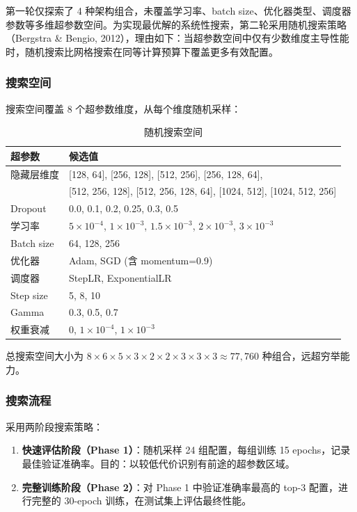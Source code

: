 \documentclass[12pt,a4paper]{ctexart}
\begin{document}
第一轮仅探索了 4 种架构组合，未覆盖学习率、batch size、优化器类型、调度器参数等多维超参数空间。为实现最优解的系统性搜索，第二轮采用随机搜索策略（Bergstra \& Bengio, 2012），理由如下：当超参数空间中仅有少数维度主导性能时，随机搜索比网格搜索在同等计算预算下覆盖更多有效配置。

\subsubsection{搜索空间}

搜索空间覆盖 8 个超参数维度，从每个维度随机采样：

\begin{table}[H]
\centering
\caption{随机搜索空间}
\begin{tabular}{@{}ll@{}}
\toprule
\textbf{超参数} & \textbf{候选值} \\
\midrule
隐藏层维度   & [128, 64], [256, 128], [512, 256], [256, 128, 64], \\
            & [512, 256, 128], [512, 256, 128, 64], [1024, 512], [1024, 512, 256] \\
Dropout     & 0.0, 0.1, 0.2, 0.25, 0.3, 0.5 \\
学习率      & $5 \times 10^{-4}$, $1 \times 10^{-3}$, $1.5 \times 10^{-3}$, $2 \times 10^{-3}$, $3 \times 10^{-3}$ \\
Batch size  & 64, 128, 256 \\
优化器      & Adam, SGD (含 momentum=0.9) \\
调度器      & StepLR, ExponentialLR \\
Step size   & 5, 8, 10 \\
Gamma       & 0.3, 0.5, 0.7 \\
权重衰减    & 0, $1 \times 10^{-4}$, $1 \times 10^{-3}$ \\
\bottomrule
\end{tabular}
\end{table}

总搜索空间大小为 $8 \times 6 \times 5 \times 3 \times 2 \times 2 \times 3 \times 3 \times 3 \approx 77,760$ 种组合，远超穷举能力。

\subsubsection{搜索流程}

采用两阶段搜索策略：

\begin{enumerate}
    \item \textbf{快速评估阶段（Phase 1）}：随机采样 24 组配置，每组训练 15 epochs，记录最佳验证准确率。目的：以较低代价识别有前途的超参数区域。
    \item \textbf{完整训练阶段（Phase 2）}：对 Phase 1 中验证准确率最高的 top-3 配置，进行完整的 30-epoch 训练，在测试集上评估最终性能。
\end{enumerate}
\end{document}
